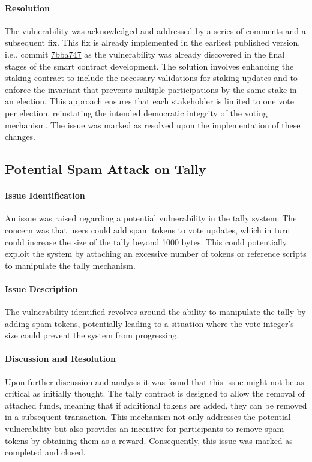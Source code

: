 \documentclass[11pt]{article}
\begin{document}
\paragraph{Resolution}
The vulnerability was acknowledged and addressed by a series of comments and a subsequent fix. This fix is already implemented in the earliest published version, i.e., commit \href{https://github.com/MuesliSwapTeam/muesliswap-atala-onchain-governance/commit/7bba7477828ae2b44ff7acc6335f0f2df080b41e}{7bba747} as the vulnerability was already discovered in the final stages of the smart contract development. The solution involves enhancing the staking contract to include the necessary validations for staking updates and to enforce the invariant that prevents multiple participations by the same stake in an election.
This approach ensures that each stakeholder is limited to one vote per election, reinstating the intended democratic integrity of the voting mechanism.
The issue was marked as resolved upon the implementation of these changes.

\subsection{Potential Spam Attack on Tally}

\paragraph{Issue Identification}
An issue was raised regarding a potential vulnerability in the tally system.
The concern was that users could add spam tokens to vote updates, which in turn could increase the size of the tally beyond 1000 bytes.
This could potentially exploit the system by attaching an excessive number of tokens or reference scripts to manipulate the tally mechanism.

\paragraph{Issue Description}
The vulnerability identified revolves around the ability to manipulate the tally by adding spam tokens, potentially leading to a situation where the vote integer's size could prevent the system from progressing.

\paragraph{Discussion and Resolution}
Upon further discussion and analysis it was found that this issue might not be as critical as initially thought.
The tally contract is designed to allow the removal of attached funds, meaning that if additional tokens are added, they can be removed in a subsequent transaction.
This mechanism not only addresses the potential vulnerability but also provides an incentive for participants to remove spam tokens by obtaining them as a reward.
Consequently, this issue was marked as completed and closed.
\end{document}

